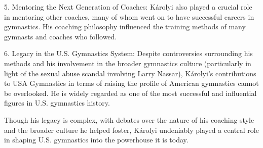 \documentclass{mcmthesis}
\begin{document}
\begin{enumerate}
\begin{description}
		5. Mentoring the Next Generation of Coaches:
		Károlyi also played a crucial role in mentoring other coaches, many of whom went on to have successful careers in gymnastics. His coaching philosophy influenced the training methods of many gymnasts and coaches who followed.
		
		6. Legacy in the U.S. Gymnastics System:
		Despite controversies surrounding his methods and his involvement in the broader gymnastics culture (particularly in light of the sexual abuse scandal involving Larry Nassar), Károlyi's contributions to USA Gymnastics in terms of raising the profile of American gymnastics cannot be overlooked. He is widely regarded as one of the most successful and influential figures in U.S. gymnastics history.
		
		Though his legacy is complex, with debates over the nature of his coaching style and the broader culture he helped foster, Károlyi undeniably played a central role in shaping U.S. gymnastics into the powerhouse it is today.
	\end{description}
	
	
	
\end{enumerate}

\clearpage
\setcounter{page}{\value{lastpage}}
	
	
	
	
	
	
\end{document}
